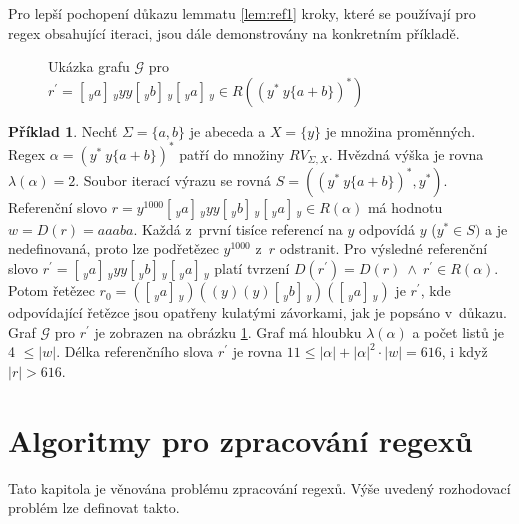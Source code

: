 \documentclass[thesis=B,czech]{FITthesis}[2019/12/23]
\theoremstyle{definition}
\newtheorem{example}{Příklad}[chapter]
\begin{document}
Pro lepší pochopení důkazu lemmatu \ref{lem:ref1} kroky, které se používají pro regex obsahující iteraci, jsou dále demonstrovány na konkretním příkladě.
 \begin{figure}[h]
\centering

\caption{Ukázka grafu $\mathcal{G}$ pro $r^\prime=[\,_y a ]\,_y y y [\,_y b ]\,_y [\,_y a ]\,_y \in R((y^\ast \ y\{a+b\})^\ast)$}\label{fig:refproof}
\end{figure}

\begin{example}
Nechť $\Sigma = \{a, b\}$ je abeceda a $X=\{y\}$ je množina proměnných. Regex $\alpha = (y^\ast \ y \{a+b\})^\ast$ patří do množiny $RV_{\Sigma, X}$. Hvězdná výška je rovna $\lambda(\alpha) = 2$. Soubor iterací výrazu se rovná $S = \left((y^\ast \ y \{a+b\})^\ast, y^\ast\right)$. Referenční slovo $r = y^{1000} [\,_y a ]\,_y y y [\,_y b ]\,_y [\,_y a ]\,_y \in R(\alpha)$ má hodnotu $w=D(r)=aaaba$. Každá z~první tisíce referencí na $y$ odpovídá $y$ ($y^\ast \in S)$ a je nedefinovaná, proto lze podřetězec $y^{1000}$ z~$r$ odstranit. Pro výsledné referenční slovo $r^\prime = [\,_y a ]\,_y y y [\,_y b ]\,_y [\,_y a ]\,_y$ platí tvrzení $D(r^\prime)=D(r) \ \wedge \ r^\prime \in R(\alpha)$. Potom řetězec $r_0 = ([\,_y a ]\,_y) ((y) (y) [\,_y b ]\,_y) ([\,_y a ]\,_y)$ je $r^\prime$, kde odpovídající řetězce jsou opatřeny kulatými závorkami, jak je popsáno v~důkazu. Graf $\mathcal{G}$ pro $r^\prime$ je zobrazen na obrázku \ref{fig:refproof}. Graf má hloubku $\lambda(\alpha)$ a počet listů je 4 $\le |w|$. Délka referenčního slova $r^\prime$ je rovna $11 \le |\alpha| + |\alpha|^2\cdot|w|=616$, i když $|r| > 616$. 
\end{example}

\chapter{Algoritmy pro zpracování regexů}
Tato kapitola je věnována problému zpracování regexů. Výše uvedený rozhodovací problém lze definovat takto.
\end{document}
